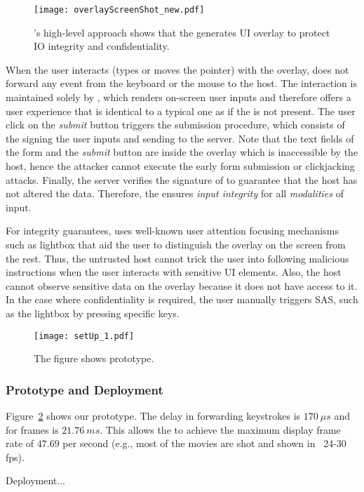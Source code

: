 \begin{figure}[t]
	\centering
	\texttt{[image: overlayScreenShot\_new.pdf]}
	\caption{\name's high-level approach shows that the \device generates UI overlay to protect IO integrity and confidentiality.}
	\label{fig:screenshot_1}
\end{figure}

When the user interacts (types or moves the pointer) with the overlay, \device does not forward any event from the keyboard or the mouse to the host. The interaction is maintained solely by \device, which renders on-screen user inputs and therefore offers a user experience that is identical to a typical one as if the \device is not present. The user click on the \emph{submit} button triggers the submission procedure, which consists of the \device signing the user inputs and sending to the server. Note that the text fields of the form and the \emph{submit} button are inside the overlay which is inaccessible by the host, hence the attacker cannot execute the early form submission or clickjacking attacks. Finally, the server verifies the signature of \device to guarantee that the host has not altered the data. Therefore, the \device ensures \emph{input integrity} for all \emph{modalities} of input.

For integrity guarantees, \name uses well-known user attention focusing mechanisms such as lightbox that aid the user to distinguish the \device overlay on the screen from the rest. Thus, the untrusted host cannot trick the user into following malicious instructions when the user interacts with sensitive UI elements. Also, the host cannot observe sensitive data on the overlay because it does not have access to it. In the case where confidentiality is required, the user manually triggers SAS, such as the lightbox by pressing specific keys.


\begin{figure}[t]
	\centering
	\texttt{[image: setUp\_1.pdf]}
	\caption{The figure shows \name prototype.}
\label{fig:prototypeArch}   
\end{figure}

\subsubsection*{Prototype and Deployment}

Figure~\ref{fig:prototypeArch} shows our \device prototype.
The delay in forwarding keystrokes is $170\ \mu s$ and for frames is $21.76\ ms$. This allows the \device to achieve the maximum display frame rate of $47.69$ per second (e.g., most of the movies are shot and shown in  ~24-30 fps).

Deployment...





